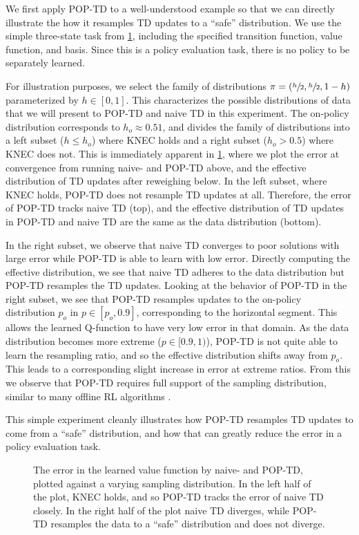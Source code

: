 We first apply POP-TD to a well-understood example so that we can directly illustrate the how it resamples TD updates to a ``safe'' distribution. We use the simple three-state task from \cref{fig:threestate}, including the specified transition function, value function, and basis. Since this is a policy evaluation task, there is no policy to be separately learned.

For illustration purposes, we select the family of distributions $\pi = (\sfrac h 2, \sfrac h 2, 1- h)$ parameterized by $h \in [0, 1]$.
This characterizes the possible distributions of data that we will present to POP-TD and naive TD in this experiment. The on-policy distribution corresponds to $h_o\approx 0.51$, and divides the family of distributions into a left subset ($h \leq h_o$) where KNEC holds and a right subset ($h_o > 0.5$) where KNEC does not. This is immediately apparent in \cref{fig:threestate}, where we plot the error at convergence from running naive- and POP-TD above, and the effective distribution of TD updates after reweighing below.
In the left subset, where KNEC holds, POP-TD does not resample TD updates at all. Therefore, the error of POP-TD tracks naive TD (top), and the effective distribution of TD updates in POP-TD and naive TD are the same as the data distribution (bottom).

In the right subset, we observe that naive TD converges to poor solutions with large error while POP-TD is able to learn with low error.
Directly computing the effective distribution, we see that naive TD adheres to the data distribution but POP-TD resamples the TD updates.
Looking at the behavior of POP-TD in the right subset, we see that POP-TD resamples updates to the on-policy distribution $p_o$ in $p\in[p_o,0.9]$, corresponding to the horizontal segment. This allows the learned Q-function to have very low error in that domain. As the data distribution becomes more extreme ($p\in [0.9, 1)$), POP-TD is not quite able to learn the resampling ratio, and so the effective distribution shifts away from $p_o$. This leads to a corresponding slight increase in error at extreme ratios. From this we observe that POP-TD requires full support of the sampling distribution, similar to many offline RL algorithms \cite{kumar2020cql,shi2022pessimistic}.

This simple experiment cleanly illustrates how POP-TD resamples TD updates to come from a ``safe'' distribution, and how that can greatly reduce the error in a policy evaluation task.

\label{sec:threestateexp}
\begin{figure}[t]
  \centering
  
  \caption{The error in the learned value function by naive- and POP-TD, plotted against a varying sampling distribution. In the left half of the plot, KNEC holds, and so POP-TD tracks the error of naive TD closely. In the right half of the plot naive TD diverges, while POP-TD resamples the data to a ``safe'' distribution and does not diverge. }
  \label{fig:threestate}
\end{figure}



